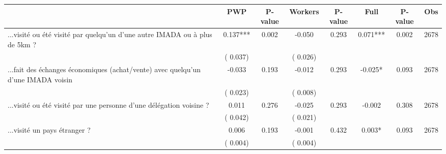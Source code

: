 
\begin{tabular}{l*{7}{c}}\hline&\multicolumn{1}{c}{PWP}&\multicolumn{1}{c}{P-value}&\multicolumn{1}{c}{Workers}&\multicolumn{1}{c}{P-value}&\multicolumn{1}{c}{Full}&\multicolumn{1}{c}{P-value}&\multicolumn{1}{c}{Obs} \\ \hline

 ...visité ou été visité par quelqu'un d'une autre IMADA ou à plus de 5km ?       &              0.137***       &        0.002  &             -0.050       &        0.293  &              0.071***       &              0.002 &  2678 \\ 
                       &       (       0.037)             &                               &       (       0.026)                     &                               &                                               &                                &                      \\ 

 ...fait des échanges économiques (achat/vente) avec quelqu'un d'une IMADA voisin       &             -0.033       &        0.193  &             -0.012       &        0.293  &             -0.025*       &              0.093 &  2678 \\ 
                       &       (       0.023)             &                               &       (       0.008)                     &                               &                                               &                                &                      \\ 

 ...visité ou été visité par une personne d'une délégation voisine ?       &              0.011       &        0.276  &             -0.025       &        0.293  &             -0.002       &              0.308 &  2678 \\ 
                       &       (       0.042)             &                               &       (       0.021)                     &                               &                                               &                                &                      \\ 

 ...visité un pays étranger ?       &              0.006       &        0.193  &             -0.001       &        0.432  &              0.003*       &              0.093 &  2678 \\ 
                       &       (       0.004)             &                               &       (       0.004)                     &                               &                                               &                                &                      \\ 

\hline \end{tabular}